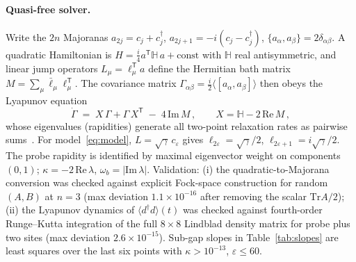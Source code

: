 \documentclass[11pt,a4paper]{article}
\theoremstyle{remark}
\newcommand{\Tr}{\mathrm{Tr}}
\newcommand{\eps}{\varepsilon}
\begin{document}
\paragraph{Quasi-free solver.}
Write the $2n$ Majoranas $a_{2j} = c_j + c_j^\dagger$,
$a_{2j+1} = -i(c_j - c_j^\dagger)$, $\{a_\alpha, a_\beta\} = 2\delta_{\alpha\beta}$. A
quadratic Hamiltonian is $H = \frac{i}{4} a^{\mathsf T} \mathbb H\, a + \mathrm{const}$
with $\mathbb H$ real antisymmetric, and linear jump operators
$L_\mu = \ell_\mu^{\mathsf T} a$ define the Hermitian bath matrix
$M = \sum_\mu \bar\ell_\mu \ell_\mu^{\mathsf T}$. The covariance matrix
$\Gamma_{\alpha\beta} = \tfrac{i}{2}\langle [a_\alpha, a_\beta]\rangle$ then obeys the
Lyapunov equation
\begin{equation}
  \dot\Gamma \;=\; X\,\Gamma + \Gamma\, X^{\mathsf T} \;-\; 4\,\mathrm{Im}\,M\,,
  \qquad X = \mathbb H - 2\,\mathrm{Re}\,M\,,
  \label{eq:lyap}
\end{equation}
whose eigenvalues (rapidities) generate all two-point relaxation rates as pairwise
sums~\cite{Prosen2008,BarthelZhang2022}. For model~\eqref{eq:model},
$L = \sqrt\gamma\, c_\eps$ gives
$\ell_{2\eps} = \sqrt\gamma/2$, $\ell_{2\eps+1} = i\sqrt\gamma/2$. The probe rapidity is
identified by maximal eigenvector weight on components $(0,1)$;
$\kappa = -2\,\mathrm{Re}\,\lambda$, $\omega_b = |\mathrm{Im}\,\lambda|$. Validation:
(i) the quadratic-to-Majorana conversion was checked against explicit Fock-space
construction for random $(A,B)$ at $n=3$ (max deviation $1.1\times 10^{-16}$ after
removing the scalar $\Tr A/2$); (ii) the Lyapunov dynamics of
$\langle d^\dagger d\rangle(t)$ was checked against fourth-order Runge--Kutta
integration of the full $8\times 8$ Lindblad density matrix for probe plus two sites
(max deviation $2.6\times 10^{-15}$). Sub-gap slopes in Table~\ref{tab:slopes} are least
squares over the last six points with $\kappa > 10^{-13}$, $\eps \le 60$.
\end{document}
